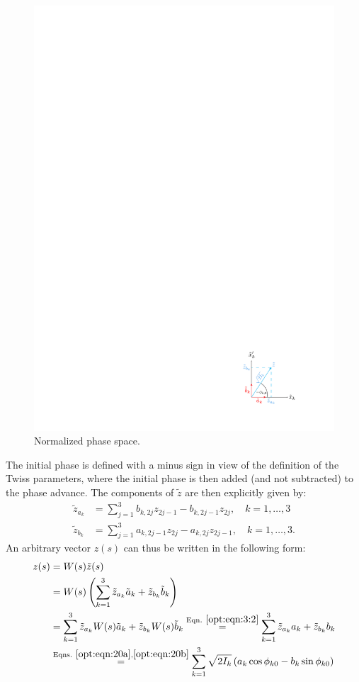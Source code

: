 \documentclass[english]{article}
\begin{document}
\begin{enumerate}
\begin{figure}[h]
	\includegraphics{normalized_phase_space_cropped.pdf}
	\caption{Normalized phase space.\label{opt:fig:1}}
\end{figure}
The initial phase is defined with a minus sign in view of the definition of the Twiss parameters, where the initial phase is then added (and not subtracted) to the phase advance. The components of $\tilde z$ are then explicitly given by:
\begin{align}
\tilde z_{a_k}&= \sum_{j=1}^3  b_{k,2j} z_{2j-1}- b_{k,2j-1} z_{2j}, \quad k=1,\ldots,3\\
\tilde z_{b_k}&= \sum_{j=1}^3 a_{k,2j-1} z_{2j}- a_{k,2j} z_{2j-1}, \quad k=1,\ldots,3.
\end{align}
An arbitrary vector $z(s)$ can thus be written in the following form:
\begin{align}
 z(s)&=W(s)\tilde z(s)\nonumber\\
 &=W(s)\left(\sum_{k=1}^{3}\tilde z_{a_k}\tilde a_k + \tilde z_{b_k}\tilde b_k\right)\nonumber\\
 &=\sum_{k=1}^{3}\tilde z_{a_k}W(s)\tilde a_k + \tilde z_{b_k}W(s)\tilde b_k\overset{\rm Eqn.~\ref{opt:eqn:3:2}}{=}\sum_{k=1}^{3}\tilde z_{a_k}a_k + \tilde z_{b_k}b_k\nonumber\\
 &\overset{\rm Eqns.~\ref
 	{opt:eqn:20a},\ref{opt:eqn:20b}}=\sum_{k=1}^{3}\sqrt{2I_k}\left(a_k\cos{\phi_{k0}}-b_k\sin{\phi_{k0}}\right)
\end{align}
\end{enumerate}
\end{document}
